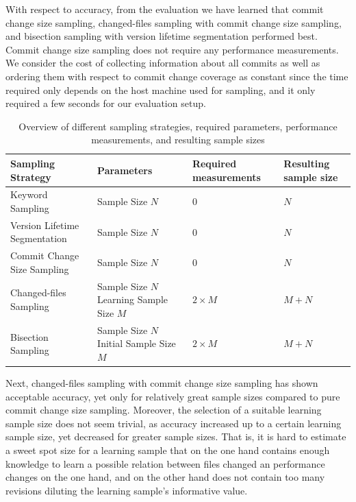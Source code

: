 With respect to accuracy, from the evaluation we have learned that commit
change size sampling, changed-files sampling with commit change size sampling,
and bisection sampling with version lifetime segmentation performed best.
Commit change size sampling does not require any performance measurements. We
consider the cost of collecting information about all commits as well as
ordering them with respect to commit change coverage as constant since the time
required only depends on the host machine used for sampling, and it only
required a few seconds for our evaluation setup. 

\begin{table}[t!]
\centering
\begin{tabular}{C{3cm}L{5cm}L{3cm}L{3cm}}
\toprule
 \textbf{Sampling Strategy} & \textbf{Parameters} & \textbf{Required
 measurements} & \textbf{Resulting sample size} \\
 \midrule
 Keyword Sampling & Sample Size $N$ & $0$ & $N$\\
 \midrule 
 Version Lifetime Segmentation & Sample Size $N$ & $0$ & $N$\\
 \midrule 
  Commit Change Size Sampling & Sample Size $N$ & $0$ & $N$\\
 \midrule 
  Changed-files Sampling & {Sample Size $N$\linebreak Learning Sample Size $M$}
  & $2\times M$ & $M + N$
  \\
 \midrule 
  Bisection Sampling & {Sample Size $N$\linebreak Initial Sample Size $M$} &
  $2\times M$ & $M + N$
  \\
 \bottomrule
\end{tabular}
\caption{Overview of different sampling strategies, required parameters,
performance measurements, and resulting sample sizes}
\label{tab:revsampling_overview}
\end{table}

Next, changed-files sampling with commit change size sampling has shown
acceptable accuracy, yet only for relatively great sample sizes compared to
pure commit change size sampling. Moreover, the selection of a suitable
learning sample size does not seem trivial, as accuracy increased up to a
certain learning sample size, yet decreased for greater sample sizes. That is,
it is hard to estimate a sweet spot size for a learning sample that on the one
hand contains enough knowledge to learn a possible relation between files
changed an performance changes on the one hand, and on the other hand does not
contain too many revisions diluting the learning sample's informative value. 

